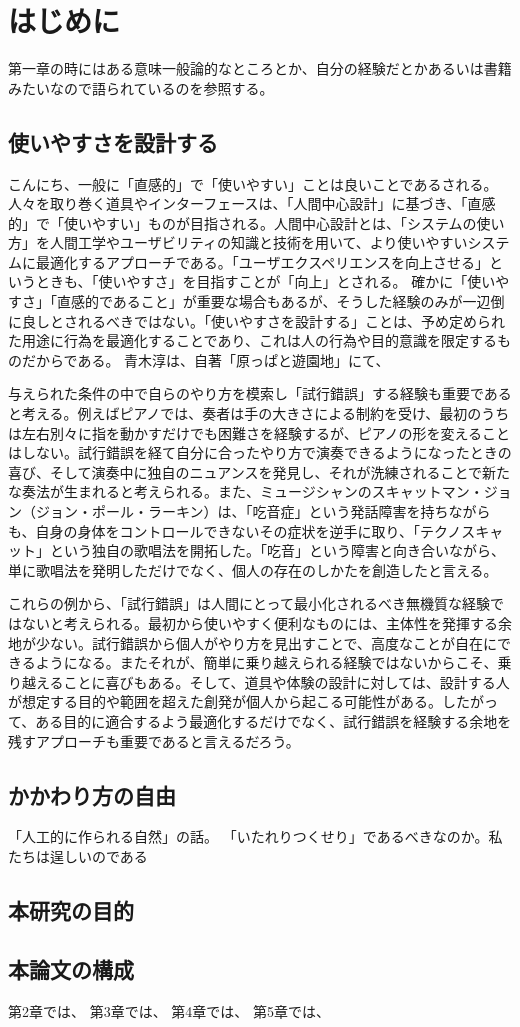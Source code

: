 \chapter{はじめに}
第一章の時にはある意味一般論的なところとか、自分の経験だとかあるいは書籍みたいなので語られているのを参照する。

\section*{使いやすさを設計する}
こんにち、一般に「直感的」で「使いやすい」ことは良いことであるされる。人々を取り巻く道具やインターフェースは、「人間中心設計」に基づき、「直感的」で「使いやすい」ものが目指される。人間中心設計とは、「システムの使い方」を人間工学やユーザビリティの知識と技術を用いて、より使いやすいシステムに最適化するアプローチである。「ユーザエクスペリエンスを向上させる」というときも、「使いやすさ」を目指すことが「向上」とされる。
確かに「使いやすさ」「直感的であること」が重要な場合もあるが、そうした経験のみが一辺倒に良しとされるべきではない。「使いやすさを設計する」ことは、予め定められた用途に行為を最適化することであり、これは人の行為や目的意識を限定するものだからである。
青木淳は、自著「原っぱと遊園地」にて、

与えられた条件の中で自らのやり方を模索し「試行錯誤」する経験も重要であると考える。例えばピアノでは、奏者は手の大きさによる制約を受け、最初のうちは左右別々に指を動かすだけでも困難さを経験するが、ピアノの形を変えることはしない。試行錯誤を経て自分に合ったやり方で演奏できるようになったときの喜び、そして演奏中に独自のニュアンスを発見し、それが洗練されることで新たな奏法が生まれると考えられる。また、ミュージシャンのスキャットマン・ジョン（ジョン・ポール・ラーキン）は、「吃音症」という発話障害を持ちながらも、自身の身体をコントロールできないその症状を逆手に取り、「テクノスキャット」という独自の歌唱法を開拓した。「吃音」という障害と向き合いながら、単に歌唱法を発明しただけでなく、個人の存在のしかたを創造したと言える。

これらの例から、「試行錯誤」は人間にとって最小化されるべき無機質な経験ではないと考えられる。最初から使いやすく便利なものには、主体性を発揮する余地が少ない。試行錯誤から個人がやり方を見出すことで、高度なことが自在にできるようになる。またそれが、簡単に乗り越えられる経験ではないからこそ、乗り越えることに喜びもある。そして、道具や体験の設計に対しては、設計する人が想定する目的や範囲を超えた創発が個人から起こる可能性がある。したがって、ある目的に適合するよう最適化するだけでなく、試行錯誤を経験する余地を残すアプローチも重要であると言えるだろう。
\section*{かかわり方の自由}

「人工的に作られる自然」の話。
「いたれりつくせり」であるべきなのか。私たちは逞しいのである\cite{Costello2005}

\section{本研究の目的}
\section{本論文の構成}
第2章では、
第3章では、
第4章では、
第5章では、
